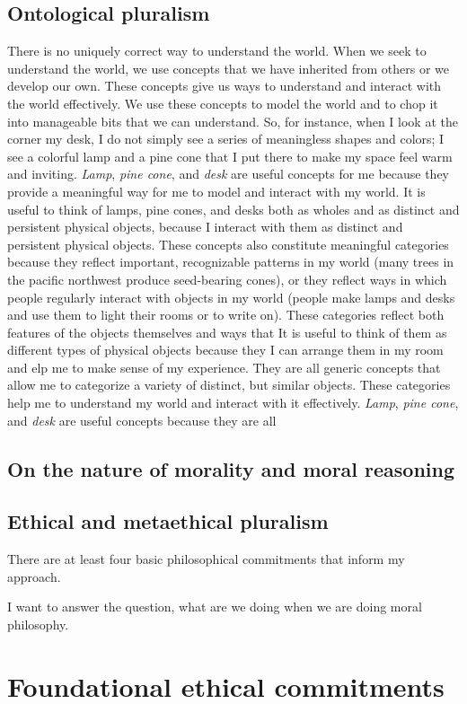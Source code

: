 \section{Ontological pluralism}
\label{sec:ont_plural}
There is no uniquely correct way to understand the world.
When we seek to understand the world, we use concepts that we have inherited from
others or we develop our own.
These concepts give us ways to understand and interact with the world
effectively.
We use these concepts to model the world and to chop it into manageable bits that
we can understand.
So, for instance, when I look at the corner my desk, I do not simply see a series
of meaningless shapes and colors; I see a colorful lamp and a pine cone that I
put there to make my space feel warm and inviting.
\emph{Lamp}, \emph{pine cone}, and \emph{desk} are useful concepts for me because they provide a
meaningful way for me to model and interact with my world.
It is useful to think of lamps, pine cones, and desks both as wholes and as
distinct and persistent physical objects, because I interact with them as
distinct and persistent physical objects.
These concepts also constitute meaningful categories because they reflect
important, recognizable patterns in my world (many trees in the pacific northwest
produce seed-bearing cones), or they reflect ways in which people regularly
interact with objects in my world (people make lamps and desks and       use them to
light their rooms or to write on).
These categories reflect both features of the objects themselves and ways that
It is useful to think of them as different types of physical objects because they
I can arrange them in my room and  elp me to make sense of my experience.
They are all generic concepts that allow me to categorize a variety of distinct,
but similar objects.
These categories help me to understand my world and interact with it effectively.
\emph{Lamp}, \emph{pine cone}, and \emph{desk} are useful concepts because they are all
\section{On the nature of morality and moral reasoning}
\label{sec:nat_mor}
\section{Ethical and metaethical pluralism}
\label{sec:eth_plur}
There are at least four basic philosophical commitments that inform my approach.

I want to answer the question, what are we doing when we are doing moral
philosophy.
\chapter{Foundational ethical commitments}
\label{ch:eth_com}
